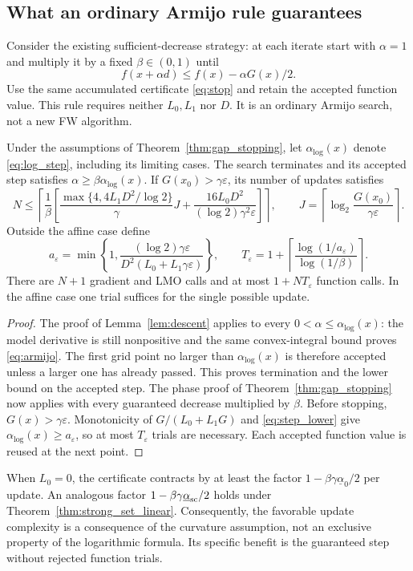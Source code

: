 \subsection{What an ordinary Armijo rule guarantees}\label{sec:armijo}
Consider the existing sufficient-decrease strategy: at each iterate start
with $\alpha=1$ and multiply it by a fixed $\beta\in(0,1)$ until
\begin{equation}\label{eq:armijo}
 f(x+\alpha d)\le f(x)-\alpha G(x)/2.
\end{equation}
Use the same accumulated certificate \eqref{eq:stop} and retain the
accepted function value. This rule requires neither $L_0,L_1$ nor $D$.
It is an ordinary Armijo search, not a new FW algorithm.

\begin{proposition}
\label{prop:armijo}
Under the assumptions of Theorem~\ref{thm:gap_stopping}, let
$\alpha_{\log}(x)$ denote \eqref{eq:log_step}, including its limiting
cases. The search terminates and its accepted step satisfies
$\alpha\ge\beta\alpha_{\log}(x)$.
If $G(x_0)>\gamma\varepsilon$, its number of updates satisfies
\[
 N\le\left\lceil\frac1\beta\left[
 \frac{\max\{4,4L_1D^2/\log2\}}\gamma J
 +\frac{16L_0D^2}{(\log2)\gamma^2\varepsilon}
 \right]\right\rceil,
 \qquad J=\left\lceil\log_2\frac{G(x_0)}{\gamma\varepsilon}\right\rceil.
\]
Outside the affine case define
\[
 a_\varepsilon=\min\left\{1,
 \frac{(\log2)\gamma\varepsilon}
 {D^2(L_0+L_1\gamma\varepsilon)}\right\},\qquad
 T_\varepsilon=1+\left\lceil\frac{\log(1/a_\varepsilon)}{\log(1/\beta)}\right\rceil.
\]
There are $N+1$ gradient and LMO calls and at most $1+NT_\varepsilon$
function calls. In the affine case one trial suffices for the single
possible update.
\end{proposition}
\begin{proof}
The proof of Lemma~\ref{lem:descent} applies to every
$0<\alpha\le\alpha_{\log}(x)$: the model derivative is still
nonpositive and the same convex-integral bound proves \eqref{eq:armijo}.
The first grid point no larger than $\alpha_{\log}(x)$ is therefore
accepted unless a larger one has already passed. This proves termination
and the lower bound on the accepted step. The phase proof of
Theorem~\ref{thm:gap_stopping} now applies with every guaranteed decrease
multiplied by $\beta$.
Before stopping, $G(x)>\gamma\varepsilon$. Monotonicity of
$G/(L_0+L_1G)$ and \eqref{eq:step_lower} give
$\alpha_{\log}(x)\ge a_\varepsilon$, so at most $T_\varepsilon$ trials
are necessary. Each accepted function value is reused at the next point.
\end{proof}
When $L_0=0$, the certificate contracts by at least the factor
$1-\beta\gamma\underline\alpha_0/2$ per update. An analogous factor
$1-\beta\gamma\underline\alpha_{\rm sc}/2$ holds under
Theorem~\ref{thm:strong_set_linear}. Consequently, the favorable update
complexity is a consequence of the curvature assumption, not an
exclusive property of the logarithmic formula. Its specific benefit
is the guaranteed step without rejected function trials.
